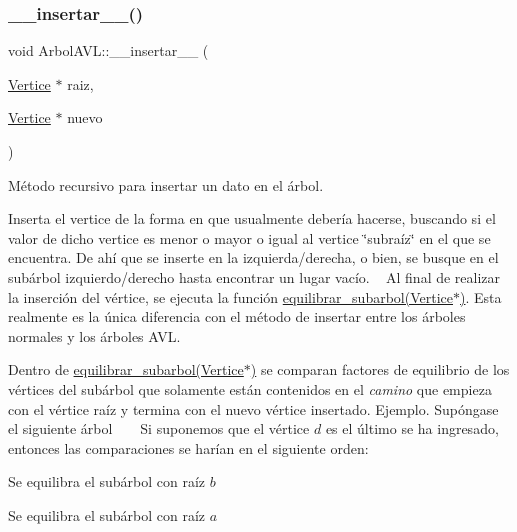 \subsubsection{\texorpdfstring{\+\_\+\+\_\+insertar\+\_\+\+\_\+()}{\_\_insertar\_\_()}}
{\footnotesize\ttfamily void Arbol\+A\+V\+L\+::\+\_\+\+\_\+insertar\+\_\+\+\_\+ (\begin{DoxyParamCaption}\item[{\hyperlink{classVertice}{Vertice} $\ast$}]{raiz,  }\item[{\hyperlink{classVertice}{Vertice} $\ast$}]{nuevo }\end{DoxyParamCaption})}



Método recursivo para insertar un dato en el árbol. 

Inserta el vertice de la forma en que usualmente debería hacerse, buscando si el valor de dicho vertice es menor o mayor o igual al vertice \char`\"{}subraíz\char`\"{} en el que se encuentra. De ahí que se inserte en la izquierda/derecha, o bien, se busque en el subárbol izquierdo/derecho hasta encontrar un lugar vacío. ~\newline
 Al final de realizar la inserción del vértice, se ejecuta la función \hyperlink{classArbolAVL_ad24ffafb198dac21a98ff19e8361fbd6}{equilibrar\+\_\+subarbol(\+Vertice$\ast$)}. Esta realmente es la única diferencia con el método de insertar entre los árboles normales y los árboles A\+VL.

Dentro de \hyperlink{classArbolAVL_ad24ffafb198dac21a98ff19e8361fbd6}{equilibrar\+\_\+subarbol(\+Vertice$\ast$)} se comparan factores de equilibrio de los vértices del subárbol que solamente están contenidos en el {\itshape camino} que empieza con el vértice raíz y termina con el nuevo vértice insertado. Ejemplo. Supóngase el siguiente árbol ~\newline
  ~\newline
 Si suponemos que el vértice $d$ es el último se ha ingresado, entonces las comparaciones se harían en el siguiente orden\+:
\begin{DoxyItemize}
\item Se equilibra el subárbol con raíz $b$
\item Se equilibra el subárbol con raíz $a$
\end{DoxyItemize}

